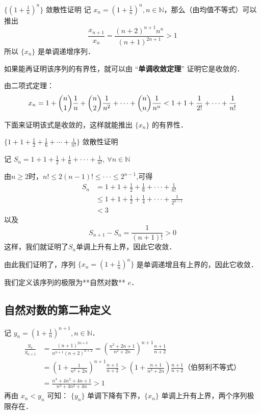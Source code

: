 

$\{(1+\frac{1}{n})^n\}$ 敛散性证明
记 $x_n=(1+\frac{1}{n})^n, n\in \mathbb{N}$，那么（由均值不等式）可以推出
\begin{equation}
  \frac{x_{n+1}}{x_n}=\frac{(n+2)^{n+1}n^{n}}{(n+1)^{2n+1}}>1
\end{equation}
所以 $\{x_n\}$ 是单调递增序列．

  如果能再证明该序列的有界性，就可以由 “\textbf{单调收敛定理}” 证明它是收敛的．

由二项式定理：
\begin{equation}
  x_n=1+{n\choose 1}\frac{1}{n}+{n\choose 2}\frac{1}{n^2}+\cdots+{n\choose n}\frac{1}{n^n}\\
  <1+1+\frac{1}{2!}+\cdots+\frac{1}{n!}
\end{equation}

下面来证明该式是收敛的，这样就能推出 $\{x_n\}$ 的有界性．

$\{1+1+\frac{1}{2}+\frac{1}{6}+\cdots+\frac{1}{n!}\}$ 敛散性证明

记 $S_n=1+1+\frac{1}{2}+\frac{1}{6}+\cdot\cdot\cdot+\frac{1}{n!},\ \forall n\in \mathbb{N}$

由$n\geq 2$时，$n!\leq2(n-1)!\leq\cdot\cdot\cdot\leq2^{n-1}$,可得
\begin{equation}
  \begin{aligned}
  S_n&=1+1+\frac{1}{2}+\frac{1}{6}+\cdot\cdot\cdot+\frac{1}{n!}\\
  &\leq1+1+\frac{1}{2}+\frac{1}{4}+\cdot\cdot\cdot+\frac{1}{2^{n-1}}\\
  &<3
  \end{aligned}
\end{equation}
  以及
\begin{equation}
  S_{n+1}-S_n=\frac{1}{(n+1)!}>0
\end{equation}
  这样，我们就证明了{$S_n$}单调上升有上界，因此它收敛．

  由此我们证明了，序列 $\{x_n=(1+\frac{1}{n})^n\}$ 是单调递增且有上界的，因此它收敛．

  我们定义该序列的极限为**自然对数** $e$．

  
\subsection{自然对数的第二种定义}
  记 $y_n=(1+\frac{1}{n})^{n+1}, n\in \mathbb{N}$．
\begin{equation}
  \begin{aligned}
  \frac{y_n}{y_{n+1}}&=\frac{(n+1)^{2n+3}}{n^{n+1}(n+2)^{n+2}}=\left(\frac{n^2+2n+1}{n^2+2n}\right)^{n+1}\frac{n+1}{n+2}\\
  &=(1+\frac{1}{n^2+2n})^{n+1}\frac{n+1}{n+2}>\left(1+\frac{n+1}{n^2+2n}\right)\frac{n+1}{n+2} \text{（伯努利不等式）}\\
  &=\frac{n^3+4n^2+4n+1}{n^3+4n^2+4n}>1
  \end{aligned}
\end{equation}
  再由 $x_n<y_n$ 可知： $\{y_n\}$ 单调下降有下界，$\{x_n\}$ 单调上升有上界，两个序列极限存在．

